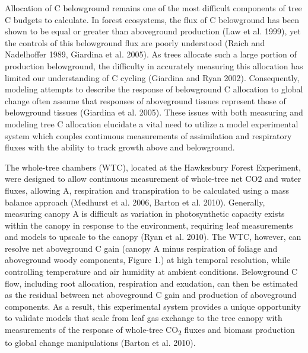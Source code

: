 \documentclass[a4paper]{article}
\begin{document}
Allocation of C belowground remains one of the most difficult components of tree C budgets to calculate. In forest ecosystems, the flux of C belowground has been shown to be equal or greater than aboveground production (Law et al. 1999), yet the controls of this belowground flux are poorly understood (Raich and Nadelhoffer 1989, Giardina et al. 2005). As trees allocate such a large portion of production belowground, the difficulty in accurately measuring this allocation has limited our understanding of C cycling (Giardina and Ryan 2002). Consequently, modeling attempts to describe the response of belowground C allocation to global change often assume that responses of aboveground tissues represent those of belowground tissues (Giardina et al. 2005). These issues with both measuring and modeling tree C allocation elucidate a vital need to utilize a model experimental system which couples continuous measurements of assimilation and respiratory fluxes with the ability to track growth above and belowground.

The whole-tree chambers (WTC), located at the Hawkesbury Forest Experiment, were designed to allow continuous measurement of whole-tree net CO2 and water fluxes, allowing A, respiration and transpiration to be calculated using a mass balance approach (Medhurst et al. 2006, Barton et al. 2010). Generally, measuring canopy A is difficult as variation in photosynthetic capacity exists within the canopy in response to the environment, requiring leaf measurements and models to upscale to the canopy (Ryan et al. 2010). The WTC, however, can resolve net aboveground C gain (canopy A minus respiration of foliage and aboveground woody components, Figure 1.) at high temporal resolution, while controlling temperature and air humidity at ambient conditions. Belowground C flow, including root allocation, respiration and exudation, can then be estimated as the residual between net aboveground C gain and production of aboveground components. As a result, this experimental system provides a unique opportunity to validate models that scale from leaf gas exchange to the tree canopy with measurements of the response of whole-tree CO\textsubscript{2} fluxes and biomass production to global change manipulations (Barton et al. 2010).
\end{document}
